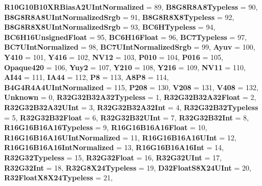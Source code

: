 \begin{DoxyCompactItemize}
{\bfseries R10\+G10\+B10\+X\+R\+Bias\+A2\+U\+Int\+Normalized} = 89, 
{\bfseries B8\+G8\+R8\+A8\+Typeless} = 90, 
\newline
{\bfseries B8\+G8\+R8\+A8\+U\+Int\+Normalized\+Srgb} = 91, 
{\bfseries B8\+G8\+R8\+X8\+Typeless} = 92, 
{\bfseries B8\+G8\+R8\+X8\+U\+Int\+Normalized\+Srgb} = 93, 
{\bfseries B\+C6\+H\+Typeless} = 94, 
\newline
{\bfseries B\+C6\+H16\+Unsigned\+Float} = 95, 
{\bfseries B\+C6\+H16\+Float} = 96, 
{\bfseries B\+C7\+Typeless} = 97, 
{\bfseries B\+C7\+U\+Int\+Normalized} = 98, 
\newline
{\bfseries B\+C7\+U\+Int\+Normalized\+Srgb} = 99, 
{\bfseries Ayuv} = 100, 
{\bfseries Y410} = 101, 
{\bfseries Y416} = 102, 
\newline
{\bfseries N\+V12} = 103, 
{\bfseries P010} = 104, 
{\bfseries P016} = 105, 
{\bfseries Opaque420} = 106, 
\newline
{\bfseries Yuy2} = 107, 
{\bfseries Y210} = 108, 
{\bfseries Y216} = 109, 
{\bfseries N\+V11} = 110, 
\newline
{\bfseries A\+I44} = 111, 
{\bfseries I\+A44} = 112, 
{\bfseries P8} = 113, 
{\bfseries A8\+P8} = 114, 
\newline
{\bfseries B4\+G4\+R4\+A4\+U\+Int\+Normalized} = 115, 
{\bfseries P208} = 130, 
{\bfseries V208} = 131, 
{\bfseries V408} = 132, 
\newline
{\bfseries Unknown} = 0, 
{\bfseries R32\+G32\+B32\+A32\+Typeless} = 1, 
{\bfseries R32\+G32\+B32\+A32\+Float} = 2, 
{\bfseries R32\+G32\+B32\+A32\+U\+Int} = 3, 
\newline
{\bfseries R32\+G32\+B32\+A32\+Int} = 4, 
{\bfseries R32\+G32\+B32\+Typeless} = 5, 
{\bfseries R32\+G32\+B32\+Float} = 6, 
{\bfseries R32\+G32\+B32\+U\+Int} = 7, 
\newline
{\bfseries R32\+G32\+B32\+Int} = 8, 
{\bfseries R16\+G16\+B16\+A16\+Typeless} = 9, 
{\bfseries R16\+G16\+B16\+A16\+Float} = 10, 
{\bfseries R16\+G16\+B16\+A16\+U\+Int\+Normalized} = 11, 
\newline
{\bfseries R16\+G16\+B16\+A16\+U\+Int} = 12, 
{\bfseries R16\+G16\+B16\+A16\+Int\+Normalized} = 13, 
{\bfseries R16\+G16\+B16\+A16\+Int} = 14, 
{\bfseries R32\+G32\+Typeless} = 15, 
\newline
{\bfseries R32\+G32\+Float} = 16, 
{\bfseries R32\+G32\+U\+Int} = 17, 
{\bfseries R32\+G32\+Int} = 18, 
{\bfseries R32\+G8\+X24\+Typeless} = 19, 
\newline
{\bfseries D32\+Float\+S8\+X24\+U\+Int} = 20, 
{\bfseries R32\+Float\+X8\+X24\+Typeless} = 21, 

\end{DoxyCompactItemize}
